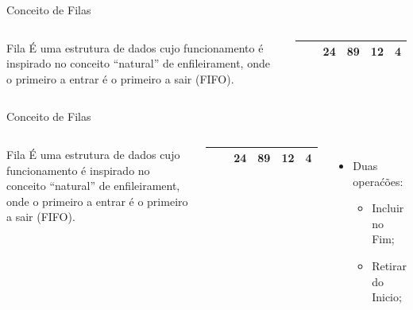 \documentclass[12pt,table,xcolor={dvipsnames}]{beamer}
\begin{document}
\begin{frame}{Conceito de Filas}
\begin{columns}
\begin{block}{Fila}
É uma estrutura de dados cujo funcionamento é inspirado no conceito “natural” de enfileirament, onde o primeiro a entrar é o primeiro a sair (FIFO).
\end{block}
\begin{center}
{
\begin{tabular}{ |p{.5cm}|p{.5cm}|p{.5cm}|p{.5cm}|p{.5cm}|p{.5cm}| }
\hline
& & 24 & 89 & 12 & 4  \\ \hline
\end{tabular}
}
\end{center}
\end{columns}
\end{frame}

\begin{frame}{Conceito de Filas}
\begin{columns}
\begin{block}{Fila}
É uma estrutura de dados cujo funcionamento é inspirado no conceito “natural” de enfileirament, onde o primeiro a entrar é o primeiro a sair (FIFO).
\end{block}
\begin{center}
{
\begin{tabular}{ |p{.5cm}|p{.5cm}|p{.5cm}|p{.5cm}|p{.5cm}|p{.5cm}| }
\hline
& & 24 & 89 & 12 & 4  \\ \hline
\end{tabular}
}
\end{center}
\begin{itemize}
\item Duas operaćões:
\begin{itemize}
\item {\color{red}Incluir no Fim};
\item {\color{red}Retirar do Inicio};
\end{itemize}
\end{itemize}
\end{columns}
\end{frame}
\end{document}
